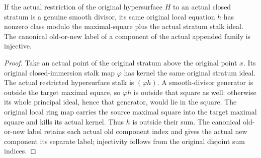 \begin{lemma}
\label{lem:kn-nadel-bertini-snc-stratum-transverse}
\leanok
If the actual restriction of the original hypersurface $H$ to an actual
closed stratum is a genuine smooth divisor, its same original local
equation $h$ has nonzero class modulo the maximal-square plus the actual
stratum stalk ideal.  The canonical old-or-new label of a component of
the actual appended family is injective.
\end{lemma}
\begin{proof}
Take an actual point of the original stratum above the original point
$x$.  Its original closed-immersion stalk map $\varphi$ has kernel the
same original stratum ideal.  The actual restricted hypersurface stalk is
$(\varphi h)$.  A smooth-divisor generator is outside the target maximal
square, so $\varphi h$ is outside that square as well: otherwise its
whole principal ideal, hence that generator, would lie in the square.
The original local ring map carries the source maximal square into the
target maximal square and kills its actual kernel.  Thus $h$ is outside
their sum.  The canonical old-or-new label retains each actual old
component index and gives the actual new component its separate label;
injectivity follows from the original disjoint sum indices.
\end{proof}

